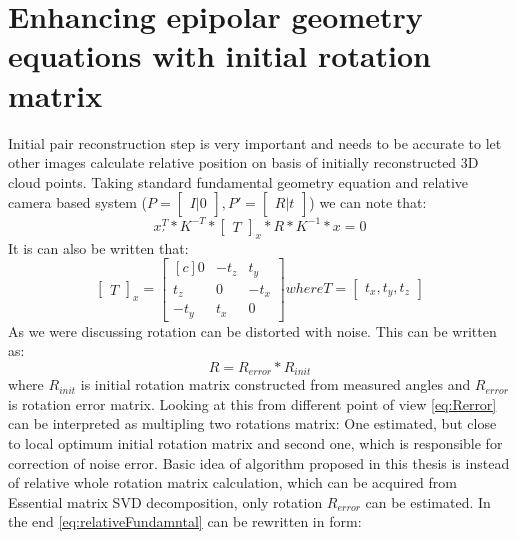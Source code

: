 \section{Enhancing epipolar geometry equations with initial rotation matrix}
Initial pair reconstruction step is very important and needs to be accurate to let other images calculate relative position on basis of initially reconstructed 3D cloud points.
Taking standard fundamental geometry equation and relative camera based system ($P = \begin{bmatrix}I |0\end{bmatrix}, P' = \begin{bmatrix}R|t\end{bmatrix}$) we can note that:
\begin{equation} \label{eq:relativeFundamntal}
{x}_{'}^{T} * K^{-T} * \begin{bmatrix}T\end{bmatrix}_{x} * R * K^{-1} * x = 0
\end{equation}
It is can also be written that:
\begin{equation} \label{eq:skewTranslation}
\begin{bmatrix}T\end{bmatrix}_{x} = 
\begin{bmatrix*}[c]
 0 & -t_{z} & t_{y}\\
 t_{z} & 0 & -t_{x}\\
-t_{y} & t_{x} & 0 
\end{bmatrix*} 
where T = \begin{bmatrix}t_{x},t_{y},t_{z}\end{bmatrix}
\end{equation}
As we were discussing rotation can be distorted with noise. This can be written as:
\begin{equation} \label{eq:Rerror}
R = R_{error} * R_{init} 
\end{equation}
where $R_{init}$ is initial rotation matrix constructed from measured angles and $R_{error}$ is rotation error matrix.
Looking at this from different point of view \ref{eq:Rerror} can be interpreted as multipling two rotations matrix: 
One estimated, but close to local optimum initial rotation matrix and second one, which is responsible for correction of noise error. 
Basic idea of algorithm proposed in this thesis is instead of relative whole rotation matrix calculation, which can be acquired from Essential matrix SVD decomposition, only rotation $R_{error}$ can be estimated. In the end \ref{eq:relativeFundamntal} can be rewritten in form:
